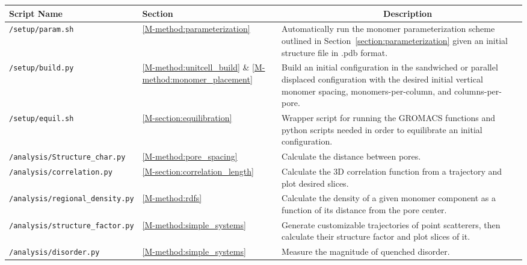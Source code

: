 \documentclass{article}
\begin{document}
  \begin{table}[htb!]
  \centering
  \begin{tabular}{|A|B|C|}
  \hline
  \textbf{Script Name} & \textbf{Section} & ~~~~~~~~~~~~~~~~~~~~~\textbf{Description} \\
  \hline
  \texttt{/setup/param.sh} & \ref{M-method:parameterization} & Automatically run the monomer
  parameterization scheme outlined in Section~\ref{section:parameterization} given an initial
  structure file in .pdb format. \\ \hline
  
  \texttt{/setup/build.py} & \ref{M-method:unitcell_build} \& \ref{M-method:monomer_placement} &
  Build an initial configuration in the sandwiched or parallel displaced configuration with the 
  desired initial vertical monomer spacing, monomers-per-column, and columns-per-pore. \\ \hline
  
  \texttt{/setup/equil.sh} & \ref{M-section:equilibration} & Wrapper script for running the GROMACS 
  functions and python scripts needed in order to equilibrate an initial configuration. \\ \hline
   
  \texttt{/analysis/Structure\_char.py} & \ref{M-method:pore_spacing} & Calculate the distance 
  between pores. \\ \hline
  
  \texttt{/analysis/correlation.py} & \ref{M-section:correlation_length} & Calculate the 3D 
  correlation function from a trajectory and plot desired slices. \\ \hline
  
  \texttt{/analysis/regional\_density.py} & \ref{M-method:rdfs} & Calculate the density of a given
  monomer component as a function of its distance from the pore center. \\ \hline
  
  \texttt{/analysis/structure\_factor.py} & \ref{M-method:simple_systems} & Generate customizable
  trajectories of point scatterers, then calculate their structure factor and plot slices of it.
  \\ \hline 
  
  \texttt{/analysis/disorder.py} & \ref{M-method:simple_systems} & Measure the magnitude of
  quenched disorder. \\ \hline
  

\end{tabular}
\end{table}
\end{document}
